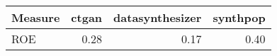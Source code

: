 \begin{tabular}{lrrr}
  \toprule
Measure & ctgan & datasynthesizer & synthpop \\ 
  \midrule
ROE & 0.28 & 0.17 & 0.40 \\ 
   \bottomrule
\end{tabular}
